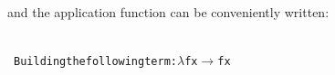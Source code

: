 \documentclass[9pt,preprint,authoryear]{sigplanconf}
\begin{document}
%
%


%
and the application function can be conveniently written{:}%


{\nopagebreak }

%
%
%
~\\~\vphantom{$\{$}\textcolor[rgb]{0.63,0.13,0.94}{\texttt{\makebox[1.22ex][c]{-}\makebox[1.22ex][c]{-}\mbox{\hspace{0.50em}}Building\mbox{\hspace{0.50em}}the\mbox{\hspace{0.50em}}following\mbox{\hspace{0.50em}}term{:}\mbox{\hspace{0.50em}}$ \lambda $\mbox{\hspace{0.50em}}f\mbox{\hspace{0.50em}}x\mbox{\hspace{0.50em}}$ \rightarrow $\mbox{\hspace{0.50em}}f\mbox{\hspace{0.50em}}x}}\textcolor[rgb]{0,0,0.80}{\texttt{{\nopagebreak \newline%
}}}
\end{document}
